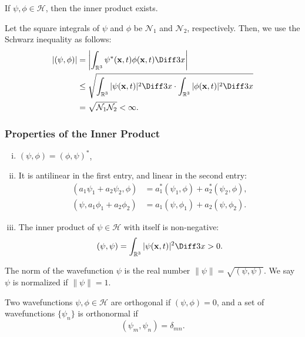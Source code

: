 \documentclass[12pt]{article}
\begin{document}
\begin{theorem}
	If $\psi, \phi \in \mathcal{H}$, then the inner product exists.
\end{theorem}

\begin{proofbox}
Let the square integrals of $\psi$ and $\phi$ be $\mathcal{N}_1$ and $\mathcal{N}_2$, respectively. Then, we use the Schwarz inequality as follows:
\begin{align*}
	|(\psi, \phi)| &= \left| \int_{\mathbb{R}^3} \psi^{\ast}(\mathbf{x}, t) \phi(\mathbf{x}, t) \Diff3 x \right| \\
		       &\leq \sqrt{\int_{\mathbb{R}^3} |\psi(\mathbf{x}, t)|^2\Diff3 x \cdot \int_{\mathbb{R}^3}|\phi(\mathbf{x}, t)|^2\Diff3 x} \\
		       &= \sqrt{\mathcal{N}_1\mathcal{N}_2} < \infty.
\end{align*}
\end{proofbox}

\subsubsection{Properties of the Inner Product}%
\label{subsub:properties_of_the_inner_product}

\begin{enumerate}[(i)]
	\item $(\psi, \phi) = (\phi, \psi)^{\ast}$,
	\item It is antilinear in the first entry, and linear in the second entry:
		\begin{align*}
			(a_1 \psi_1 +a_2 \psi_2, \phi) &= a_1^{\ast}(\psi_1, \phi) + a_2^{\ast}(\psi_2, \phi), \\
			(\psi, a_1 \phi_1 + a_2 \phi_2) &= a_1(\psi, \phi_1) + a_2(\psi, \phi_2).
		\end{align*}
	\item The inner product of $\psi \in \mathcal{H}$ with itself is non-negative:
		\[
			(\psi, \psi) = \int_{\mathbb{R}^3} |\psi(\mathbf{x}, t)|^2 \Diff3 x > 0
		.\]
\end{enumerate}

\begin{definition}
	The norm of the wavefunction $\psi$ is the real number $\|\psi\| = \sqrt{(\psi, \psi)}$. We say $\psi$ is normalized if $\|\psi\| = 1$.
\end{definition}

\begin{definition}
	Two wavefunctions $\psi, \phi \in \mathcal{H}$ are orthogonal if $(\psi, \phi) = 0$, and a set of wavefunctions $\{\psi_n\}$ is orthonormal if
	\[
		(\psi_m, \psi_n) = \delta_{mn}
	.\]
\end{definition}
\end{document}
